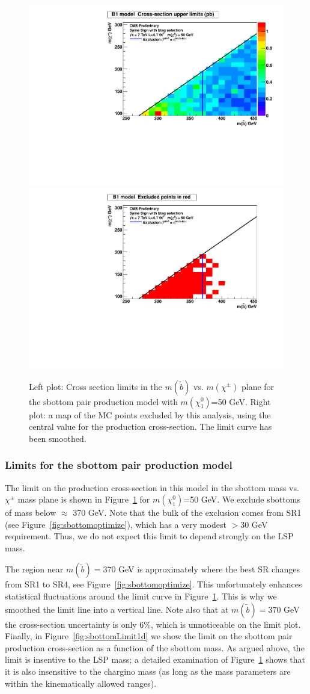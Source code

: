 \begin{figure}[htb]
\begin{center}
\includegraphics[width=0.48\linewidth]{figs/B1_LimitsOnCarpet.pdf}
\includegraphics[width=0.48\linewidth]{figs/B1_ExcludedRegionMap.pdf}
\caption{Left plot: Cross section limits in the $m(\widetilde{b})$ vs. $m(\chi^{\pm})$ 
plane for the sbottom pair production model with 
$m(\chi^0_1)$=50 GeV.  Right plot: a map of the MC points excluded by this
analysis, using the central value for the production cross-section.
The limit curve has been smoothed.
\label{fig:sbottomLimit}}
\end{center}
\end{figure}





\subsubsection{Limits for the sbottom pair production model}
\label{sec:sbottompairlimits}
The limit on the production cross-section in this model in the 
sbottom mass vs. $\chi^{\pm}$ mass plane is shown in 
Figure~\ref{fig:sbottomLimit} for 
$m(\chi^0_1)$=50 GeV. We exclude sbottoms of mass below $\approx$ 
370 GeV.  Note that the bulk of the exclusion comes 
from SR1 (see Figure~\ref{fig:sbottomoptimize}), which
has a very modest \met $> 30$ GeV requirement.  Thus, we do not
expect this limit to depend strongly on the LSP mass.


The region near $m(\widetilde{b}) = 370$ GeV is approximately where 
the best SR changes from SR1 to SR4, see Figure~\ref{fig:sbottomoptimize}.
This unfortunately enhances statistical fluctuations around 
the limit curve in Figure~\ref{fig:sbottomLimit}.  This is why 
we smoothed the limit line into a vertical line.
Note also that
at $m(\widetilde{b}) = 370$ GeV the cross-section uncertainty
is only 6\%, which is unnoticeable on the limit plot.
Finally, in Figure~\ref{fig:sbottomLimit1d} we show the limit
on the sbottom pair production cross-section as a function of the 
sbottom mass.  As argued above, the limit is insentive to the 
LSP mass; a detailed examination of Figure~\ref{fig:sbottomLimit}
shows that it is also insensitive to the chargino mass (as long
as the mass parameters are within the kinematically allowed 
ranges).


